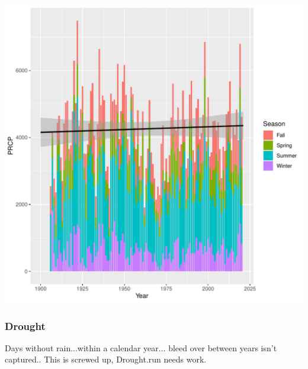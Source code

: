 \documentclass{article}\usepackage[]{graphicx}\usepackage[]{color}
\makeatletter
\def\maxwidth{ %
  \ifdim\Gin@nat@width>\linewidth
    \linewidth
  \else
    \Gin@nat@width
  \fi
}
\newenvironment{kframe}{%
 \def\at@end@of@kframe{}%
 \ifinner\ifhmode%
  \def\at@end@of@kframe{\end{minipage}}%
  \begin{minipage}{\columnwidth}%
 \fi\fi%
 \def\FrameCommand##1{\hskip\@totalleftmargin \hskip-\fboxsep
 \colorbox{shadecolor}{##1}\hskip-\fboxsep
     \hskip-\linewidth \hskip-\@totalleftmargin \hskip\columnwidth}%
 \MakeFramed {\advance\hsize-\width
   \@totalleftmargin\z@ \linewidth\hsize
   \@setminipage}}%
 {\par\unskip\endMakeFramed%
 \at@end@of@kframe}
\newenvironment{knitrout}{}{} %
\makeatother
\begin{document}
\begin{knitrout}
\color{fgcolor}\begin{kframe}


{\ttfamily\noindent\itshape{}}\end{kframe}
\includegraphics[width=\maxwidth]{figure/unnamed-chunk-9-1} 
\end{knitrout}

\subsubsection{Drought}

Days without rain...within a calendar year... bleed over between years isn't captured.. This is screwed up, Drought.run needs work.
\end{document}
